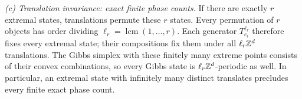 \begin{remark}
\emph{(c) Translation invariance: exact finite phase counts.}
If there are exactly $r$ extremal states, translations permute these $r$
states. Every permutation of $r$ objects has order dividing
$\ell_r=\operatorname{lcm}(1,\ldots,r)$. Each generator $T_{e_i}^{\ell_r}$ therefore
fixes every extremal state; their compositions fix them under all
$\ell_r\mathbb Z^d$ translations. The Gibbs simplex with these finitely many extreme
points consists of their convex combinations, so every Gibbs state is
$\ell_r\mathbb Z^d$-periodic as well. In particular, an extremal state with infinitely
many distinct translates precludes every finite exact phase count.
\end{remark}
